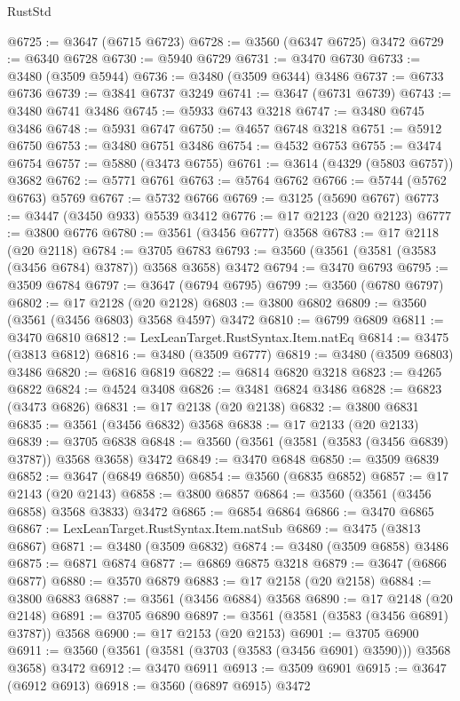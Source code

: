 \begin{lexlean}{RustStd}
\begin{coremodule}
@6725 := @3647 (@6715 @6723)
@6728 := @3560 (@6347 @6725) @3472
@6729 := @6340 @6728
@6730 := @5940 @6729
@6731 := @3470 @6730
@6733 := @3480 (@3509 @5944)
@6736 := @3480 (@3509 @6344) @3486
@6737 := @6733 @6736
@6739 := @3841 @6737 @3249
@6741 := @3647 (@6731 @6739)
@6743 := @3480 @6741 @3486
@6745 := @5933 @6743 @3218
@6747 := @3480 @6745 @3486
@6748 := @5931 @6747
@6750 := @4657 @6748 @3218
@6751 := @5912 @6750
@6753 := @3480 @6751 @3486
@6754 := @4532 @6753
@6755 := @3474 @6754
@6757 := @5880 (@3473 @6755)
@6761 := @3614 (@4329 (@5803 @6757)) @3682
@6762 := @5771 @6761
@6763 := @5764 @6762
@6766 := @5744 (@5762 @6763) @5769
@6767 := @5732 @6766
@6769 := @3125 (@5690 @6767)
@6773 := @3447 (@3450 @933) @5539 @3412
@6776 := @17 @2123 (@20 @2123)
@6777 := @3800 @6776
@6780 := @3561 (@3456 @6777) @3568
@6783 := @17 @2118 (@20 @2118)
@6784 := @3705 @6783
@6793 := @3560 (@3561 (@3581 (@3583 (@3456 @6784) @3787)) @3568 @3658) @3472
@6794 := @3470 @6793
@6795 := @3509 @6784
@6797 := @3647 (@6794 @6795)
@6799 := @3560 (@6780 @6797)
@6802 := @17 @2128 (@20 @2128)
@6803 := @3800 @6802
@6809 := @3560 (@3561 (@3456 @6803) @3568 @4597) @3472
@6810 := @6799 @6809
@6811 := @3470 @6810
@6812 := LexLeanTarget.RustSyntax.Item.natEq
@6814 := @3475 (@3813 @6812)
@6816 := @3480 (@3509 @6777)
@6819 := @3480 (@3509 @6803) @3486
@6820 := @6816 @6819
@6822 := @6814 @6820 @3218
@6823 := @4265 @6822
@6824 := @4524 @3408
@6826 := @3481 @6824 @3486
@6828 := @6823 (@3473 @6826)
@6831 := @17 @2138 (@20 @2138)
@6832 := @3800 @6831
@6835 := @3561 (@3456 @6832) @3568
@6838 := @17 @2133 (@20 @2133)
@6839 := @3705 @6838
@6848 := @3560 (@3561 (@3581 (@3583 (@3456 @6839) @3787)) @3568 @3658) @3472
@6849 := @3470 @6848
@6850 := @3509 @6839
@6852 := @3647 (@6849 @6850)
@6854 := @3560 (@6835 @6852)
@6857 := @17 @2143 (@20 @2143)
@6858 := @3800 @6857
@6864 := @3560 (@3561 (@3456 @6858) @3568 @3833) @3472
@6865 := @6854 @6864
@6866 := @3470 @6865
@6867 := LexLeanTarget.RustSyntax.Item.natSub
@6869 := @3475 (@3813 @6867)
@6871 := @3480 (@3509 @6832)
@6874 := @3480 (@3509 @6858) @3486
@6875 := @6871 @6874
@6877 := @6869 @6875 @3218
@6879 := @3647 (@6866 @6877)
@6880 := @3570 @6879
@6883 := @17 @2158 (@20 @2158)
@6884 := @3800 @6883
@6887 := @3561 (@3456 @6884) @3568
@6890 := @17 @2148 (@20 @2148)
@6891 := @3705 @6890
@6897 := @3561 (@3581 (@3583 (@3456 @6891) @3787)) @3568
@6900 := @17 @2153 (@20 @2153)
@6901 := @3705 @6900
@6911 := @3560 (@3561 (@3581 (@3703 (@3583 (@3456 @6901) @3590))) @3568 @3658) @3472
@6912 := @3470 @6911
@6913 := @3509 @6901
@6915 := @3647 (@6912 @6913)
@6918 := @3560 (@6897 @6915) @3472

\end{coremodule}
\end{lexlean}
